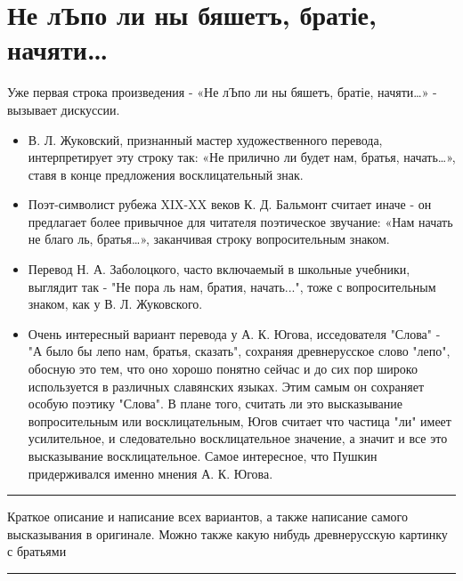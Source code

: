 \documentclass[14pt, a4paper]{article}
\newcommand{\descr}[1]
{\par\noindent\rule{0.5\textwidth}{0.4pt} \par {\large #1} \par\noindent\rule{0.5\textwidth}{0.4pt}}
\begin{document}
{\section{Не лЪпо ли ны бяшетъ, бра­тіе, начяти…}
\par Уже первая строка произведения - «Не лЪпо ли ны бяшетъ, бра­тіе, начяти…» - вызывает дискуссии. 
\begin{itemize}
  \item В. Л. Жуковский, признанный мастер художественного перевода, интерпретирует эту строку так: «Не прилично ли будет нам, братья, начать…», ставя в конце предложения восклицательный знак. 
  \item Поэт-символист рубежа XIX-XX веков К. Д. Бальмонт считает иначе - он предлагает более привычное для читателя поэтическое звучание: «Нам начать не благо ль, братья…», заканчивая строку вопросительным знаком.
  \item Перевод Н. А. Заболоцкого, часто включаемый в школьные учебники, выглядит так - "Не пора ль нам, братия, начать...", тоже с вопросительным знаком, как у В. Л. Жуковского.
  \item Очень интересный вариант перевода у А. К. Югова, исседователя "Слова" - "А было бы лепо нам, братья, сказать", сохраняя древнерусское слово "лепо", обосную это тем, что оно хорошо понятно сейчас и до сих пор широко используется в различных славянских языках. Этим самым он сохраняет особую поэтику "Слова". В плане того, считать ли это высказывание вопросительным или восклицательным, Югов считает что частица "ли" имеет усилительное, и следовательно восклицательное значение, а значит и все это высказывание восклицательное. Самое интересное, что Пушкин придерживался именно мнения А. К. Югова.
\end{itemize}
\descr{
Краткое описание и написание всех вариантов, а также написание самого высказывания в оригинале. Можно также какую нибудь древнерусскую картинку с братьями}

}
\end{document}
